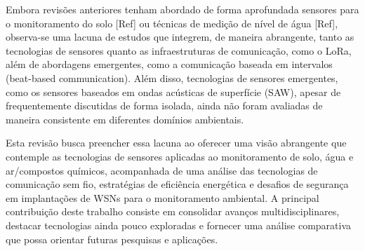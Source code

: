 Embora revisões anteriores tenham abordado de forma aprofundada sensores para o monitoramento do solo [Ref] ou técnicas de medição de nível de água [Ref], observa-se uma lacuna de estudos que integrem, de maneira abrangente, tanto as tecnologias de sensores quanto as infraestruturas de comunicação, como o LoRa, além de abordagens emergentes, como a comunicação baseada em intervalos (beat-based communication). Além disso, tecnologias de sensores emergentes, como os sensores baseados em ondas acústicas de superfície (SAW), apesar de frequentemente discutidas de forma isolada, ainda não foram avaliadas de maneira consistente em diferentes domínios ambientais.

Esta revisão busca preencher essa lacuna ao oferecer uma visão abrangente que contemple as tecnologias de sensores aplicadas ao monitoramento de solo, água e ar/compostos químicos, acompanhada de uma análise das tecnologias de comunicação sem fio, estratégias de eficiência energética e desafios de segurança em implantações de WSNs para o monitoramento ambiental. A principal contribuição deste trabalho consiste em consolidar avanços multidisciplinares, destacar tecnologias ainda pouco exploradas e fornecer uma análise comparativa que possa orientar futuras pesquisas e aplicações.
